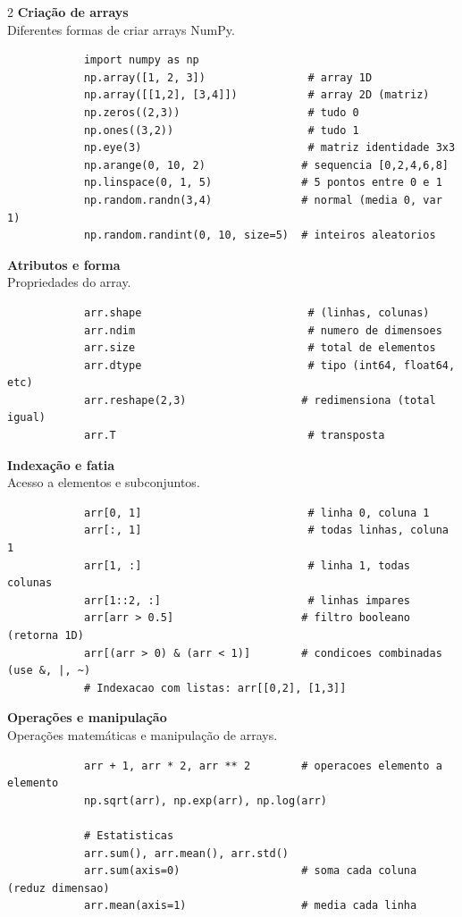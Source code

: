 \documentclass[a4paper]{article}
\begin{document}
\begin{multicols}{2}
		\noindent\textbf{Criação de arrays} \\
		Diferentes formas de criar arrays NumPy.
		\begin{lstlisting}
			import numpy as np
			np.array([1, 2, 3])                # array 1D
			np.array([[1,2], [3,4]])           # array 2D (matriz)
			np.zeros((2,3))                    # tudo 0
			np.ones((3,2))                     # tudo 1
			np.eye(3)                          # matriz identidade 3x3
			np.arange(0, 10, 2)               # sequencia [0,2,4,6,8]
			np.linspace(0, 1, 5)              # 5 pontos entre 0 e 1
			np.random.randn(3,4)              # normal (media 0, var 1)
			np.random.randint(0, 10, size=5)  # inteiros aleatorios
		\end{lstlisting}
		
		\noindent\textbf{Atributos e forma} \\
		Propriedades do array.
		\begin{lstlisting}
			arr.shape                          # (linhas, colunas)
			arr.ndim                           # numero de dimensoes
			arr.size                           # total de elementos
			arr.dtype                          # tipo (int64, float64, etc)
			arr.reshape(2,3)                  # redimensiona (total igual)
			arr.T                              # transposta
		\end{lstlisting}
		
		\noindent\textbf{Indexação e fatia} \\
		Acesso a elementos e subconjuntos.
		\begin{lstlisting}
			arr[0, 1]                          # linha 0, coluna 1
			arr[:, 1]                          # todas linhas, coluna 1
			arr[1, :]                          # linha 1, todas colunas
			arr[1::2, :]                       # linhas impares
			arr[arr > 0.5]                    # filtro booleano (retorna 1D)
			arr[(arr > 0) & (arr < 1)]        # condicoes combinadas (use &, |, ~)
			# Indexacao com listas: arr[[0,2], [1,3]]
		\end{lstlisting}
		
		\noindent\textbf{Operações e manipulação} \\
		Operações matemáticas e manipulação de arrays.
		\begin{lstlisting}
			arr + 1, arr * 2, arr ** 2        # operacoes elemento a elemento
			np.sqrt(arr), np.exp(arr), np.log(arr)
			
			# Estatisticas
			arr.sum(), arr.mean(), arr.std()
			arr.sum(axis=0)                   # soma cada coluna (reduz dimensao)
			arr.mean(axis=1)                  # media cada linha
			

\end{lstlisting}
\end{multicols}
\end{document}
